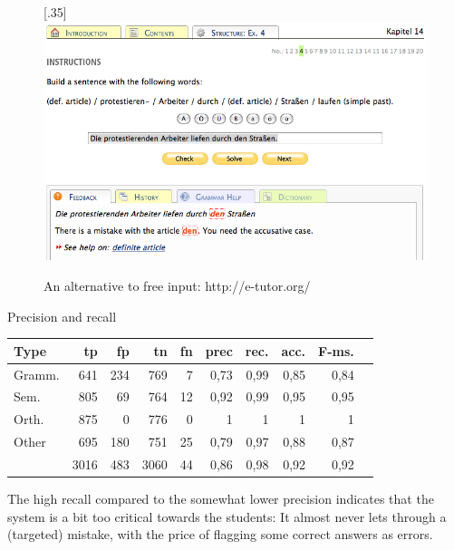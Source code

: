 \documentclass[11pt]{article}
\begin{document}
\begin{figure}[htbp]
\begin{center}
\scalebox{.35}[.35]{\includegraphics{presentation/img/e-tutor.png}}\\
\caption{An alternative to free input: http://e-tutor.org/}
\end{center}
\end{figure}
 
Precision and recall
\begin{table}[htbp]
\begin{tabular}{|l|r|r|r|r||r|r|r|r|r|}
\hline
Type	& tp		& fp		& tn		& fn	& prec	 & rec.	& acc.	& F-ms. \\
\hline
Gramm.    &   641   &   234   &   769    &   7    &   0,73   &   0,99   &   0,85   &   0,84	  \\
Sem.       &   805   &   69    &   764    &   12   &   0,92   &   0,99   &   0,95   &   0,95		  \\
Orth.      &   875   &   0     &   776    &   0    &   1      &   1      &   1      &   1					  \\
Other      &   695   &   180   &   751    &   25   &   0,79   &   0,97   &   0,88   &   0,87	  \\
\hline
  &   3016  &   483   &   3060   &   44   &   0,86   &   0,98   &   0,92   &   0,92			  \\
\hline
\end{tabular}
\end{table}%

The high recall compared to the somewhat lower precision indicates that the system is a bit too critical towards the students:
It almost never lets through a (targeted) mistake, with the price of flagging some correct answers as errors.
 
\end{document}
